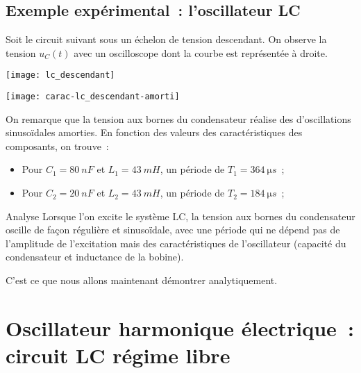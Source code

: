 \documentclass[../main/main.tex]{subfiles}
\begin{document}
\subsection{Exemple expérimental~: l'oscillateur LC}

Soit le circuit suivant sous un échelon de tension descendant. On observe la
tension $u_C(t)$ avec un oscilloscope dont la courbe est représentée à droite.

\begin{minipage}{0.50\linewidth}
    \begin{center}
        \texttt{[image: lc\_descendant]}
    \end{center}
\end{minipage}
\begin{minipage}{0.50\linewidth}
    \begin{center}
        \texttt{[image: carac-lc\_descendant-amorti]}
    \end{center}
\end{minipage}

\bigbreak On remarque que la tension aux bornes du condensateur réalise des
d'oscillations sinusoïdales amorties. En fonction des valeurs des
caractéristiques des composants, on trouve~:
\begin{itemize}
    \item Pour $C_1 = \SI{80}{nF}$ et $L_1 = \SI{43}{mH}$, un période de $T_1 =
        \SI{364}{\micro s}$~;
    \item Pour $C_2 = \SI{20}{nF}$ et $L_2 = \SI{43}{mH}$, un période de $T_2 =
        \SI{184}{\micro s}$~;
\end{itemize}

\begin{instruc}{Analyse}
    Lorsque l'on excite le système LC, la tension aux bornes du condensateur
    oscille de façon régulière et sinusoïdale, avec une période qui ne dépend pas
    de l'amplitude de l'excitation mais des caractéristiques de l'oscillateur
    (capacité du condensateur et inductance de la bobine). 
\end{instruc}

C'est ce que nous allons maintenant démontrer analytiquement.

\section{Oscillateur harmonique électrique~: circuit LC régime
libre}\label{sec:lclibre}
\end{document}
